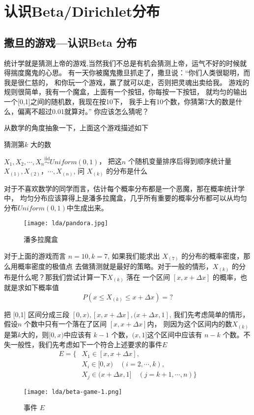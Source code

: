 %
\chapter{认识Beta/Dirichlet分布}
\section{撒旦的游戏---认识Beta 分布}

统计学就是猜测上帝的游戏,当然我们不总是有机会猜测上帝，运气不好的时候就得揣度魔鬼的心思。
有一天你被魔鬼撒旦抓走了，撒旦说：“你们人类很聪明，而我是很仁慈的，
和你玩一个游戏，赢了就可以走，否则把灵魂出卖给我。
游戏的规则很简单，我有一个魔盒，上面有一个按钮，你每按一下按钮，
就均匀的输出一个[0,1]之间的随机数，我现在按10下，
我手上有10个数，你猜第7大的数是什么，偏离不超过0.01就算对。” 你应该怎么猜呢？

从数学的角度抽象一下，上面这个游戏描述如下
\begin{algorithm}[H]
\caption{猜测第$k$ 大的数}
\begin{algorithmic}[1]
\STATE $X_1,X_2,\cdots,X_n {\stackrel{\mathrm{iid}}{\sim}} Uniform(0,1)$，
\STATE 把这$n$ 个随机变量排序后得到顺序统计量 $X_{(1)},X_{(2)}，\cdots, X_{(n)}$,
\STATE 问 $X_{(k)}$ 的分布是什么
\end{algorithmic}
\end{algorithm}
对于不喜欢数学的同学而言，估计每个概率分布都是一个恶魔，那在概率统计学中，
均匀分布应该算得上是潘多拉魔盒，几乎所有重要的概率分布都可以从均匀分布$Uniform(0,1)$中生成出来。
\begin{figure}[htbp]
\centering
\texttt{[image: lda/pandora.jpg]}
\caption{潘多拉魔盒}
\end{figure}

对于上面的游戏而言 $n=10,k=7$, 如果我们能求出 $X_{(7)}$ 的分布的概率密度，那么用概率密度的极值点
去做猜测就是最好的策略。对于一般的情形，$X_{(k)}$ 的分布是什么呢？那我们尝试计算一下$X_{(k)}$ 落在
一个区间 $[x, x+\Delta x]$ 的概率，也就是求如下概率值
$$ P( x \le X_{(k)} \le x+\Delta x) = ? $$

把 [0,1] 区间分成三段 $[0,x), [x,x+\Delta x], (x+\Delta x,1]$,
我们先考虑简单的情形，假设$n$ 个数中只有一个落在了区间 $[x, x+\Delta x]$内，
则因为这个区间内的数$X_{(k)}$是第$k$大的，则$[0,x)$中应该有 $k-1$ 个数，$(x,1]$这个区间中应该有
$n-k$ 个数。不失一般性，我们先考虑如下一个符合上述要求的事件$E$
\begin{align*}
 E = \{ & X_1 \in [x, x+\Delta x],  \\
 & X_i \in [0,x)\quad (i=2,\cdots,k), \\
 & X_j \in (x+\Delta x,1] \quad (j=k+1,\cdots,n)\}
\end{align*}
\begin{figure}[htbp]
\centering
\texttt{[image: lda/beta-game-1.png]}
\caption{事件 $E$}
\end{figure}

